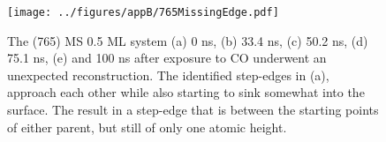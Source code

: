 \begin{landscape}
\begin{figure}
\centering
\texttt{[image: ../figures/appB/765MissingEdge.pdf]}
\caption{The (765) MS 0.5 ML system (a) 0 ns, (b) 33.4 ns, (c) 50.2 ns, (d)
75.1 ns, (e) and 100 ns after exposure to CO underwent an unexpected reconstruction.
The identified step-edges in (a), approach each other while also starting
to sink somewhat into the surface. The result in a step-edge that is between
the starting points of either parent, but still of only one atomic height.}
\label{fig:765Edge}
\end{figure}
\end{landscape}
\newpage

